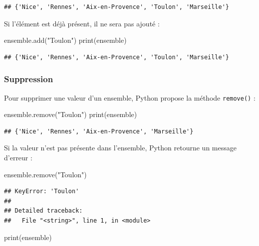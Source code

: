 \documentclass[12pt,]{book}
\newenvironment{Shaded}{\begin{snugshade}}{\end{snugshade}}
\newcommand{\StringTok}[1]{\textcolor[rgb]{0.31,0.60,0.02}{#1}}
\newcommand{\BuiltInTok}[1]{#1}
\newcommand{\NormalTok}[1]{#1}
\numberwithin{equation}{section}
\numberwithin{countremarque}{section}
\begin{document}
\begin{lstlisting}
## {'Nice', 'Rennes', 'Aix-en-Provence', 'Toulon', 'Marseille'}
\end{lstlisting}

Si l'élément est déjà présent, il ne sera pas ajouté :

\begin{Shaded}
\begin{Highlighting}[]
\NormalTok{ensemble.add(}\StringTok{"Toulon"}\NormalTok{)}
\BuiltInTok{print}\NormalTok{(ensemble)}
\end{Highlighting}
\end{Shaded}

\begin{lstlisting}
## {'Nice', 'Rennes', 'Aix-en-Provence', 'Toulon', 'Marseille'}
\end{lstlisting}

\subsubsection{Suppression}\label{suppression}

Pour supprimer une valeur d'un ensemble, Python propose la méthode
\texttt{remove()} :

\begin{Shaded}
\begin{Highlighting}[]
\NormalTok{ensemble.remove(}\StringTok{"Toulon"}\NormalTok{)}
\BuiltInTok{print}\NormalTok{(ensemble)}
\end{Highlighting}
\end{Shaded}

\begin{lstlisting}
## {'Nice', 'Rennes', 'Aix-en-Provence', 'Marseille'}
\end{lstlisting}

Si la valeur n'est pas présente dans l'ensemble, Python retourne un
message d'erreur :

\begin{Shaded}
\begin{Highlighting}[]
\NormalTok{ensemble.remove(}\StringTok{"Toulon"}\NormalTok{)}
\end{Highlighting}
\end{Shaded}

\begin{lstlisting}
## KeyError: 'Toulon'
## 
## Detailed traceback: 
##   File "<string>", line 1, in <module>
\end{lstlisting}

\begin{Shaded}
\begin{Highlighting}[]
\BuiltInTok{print}\NormalTok{(ensemble)}
\end{Highlighting}
\end{Shaded}
\end{document}
